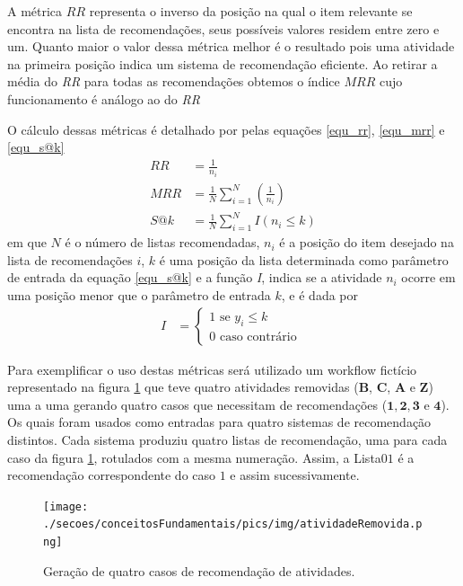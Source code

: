 A métrica \(RR\) representa o inverso da posição na qual o item relevante se encontra na lista de recomendações, seus possíveis valores residem entre zero e um. Quanto maior o valor dessa métrica melhor é o resultado pois uma atividade na primeira posição indica um sistema de recomendação eficiente. Ao retirar a média do \emph{RR} para todas as recomendações obtemos o índice \(MRR\) cujo funcionamento é análogo ao do \emph{RR}

O cálculo dessas métricas é detalhado por  pelas equações \eqref{equ_rr}, \eqref{equ_mrr} e \eqref{equ_s@k}
\begin{align}
RR & = \frac{1}{n_{i}}													\label{equ_rr}\\
MRR &= \frac{1}{N} \sum\limits_{i=1}^{N} \left( \frac{1}{n_{i}} \right) \label{equ_mrr}\\
S@k &= \frac{1}{N} \sum\limits_{i=1}^{N} I(n_{i} \leq k) 				\label{equ_s@k}
\end{align}
em que \(N\) é o número de listas recomendadas, \(n_{i}\) é a posição do item desejado na lista de recomendações \(i\), \(k\) é uma posição da lista determinada como parâmetro de entrada da equação \eqref{equ_s@k} e a função \emph{I}, indica se a atividade \(n_{i}\) ocorre em uma posição menor que o parâmetro de entrada \(k\), e é dada por
\begin{align}
I   &= \begin{cases} \label{equ_indicativa}
			1 \textrm{ se } y_{i} \leq k \\
			0 \textrm{ caso contrário }
	    \end{cases}
\end{align}

Para exemplificar o uso destas métricas será utilizado um workflow fictício representado na figura \ref{figura_atividades_removidas} que teve quatro atividades removidas (\textbf{B}, \textbf{C}, \textbf{A} e \textbf{Z}) uma a uma gerando quatro casos que necessitam de recomendações (\(\mathbf{1}, \mathbf{2}, \mathbf{3}\) e \(\mathbf{4}\)). Os quais foram usados como entradas para quatro sistemas de recomendação distintos. Cada sistema produziu quatro listas de recomendação, uma para cada caso da figura \ref{figura_atividades_removidas}, rotulados com a mesma numeração. Assim, a Lista\(01\) é a recomendação correspondente do caso \(1\) e assim sucessivamente.
\begin{figure}[!hbt]
    \centering   
    \caption{Geração de quatro casos de recomendação de atividades.}
    \texttt{[image: ./secoes/conceitosFundamentais/pics/img/atividadeRemovida.png]}
	\label{figura_atividades_removidas}
\end{figure}

